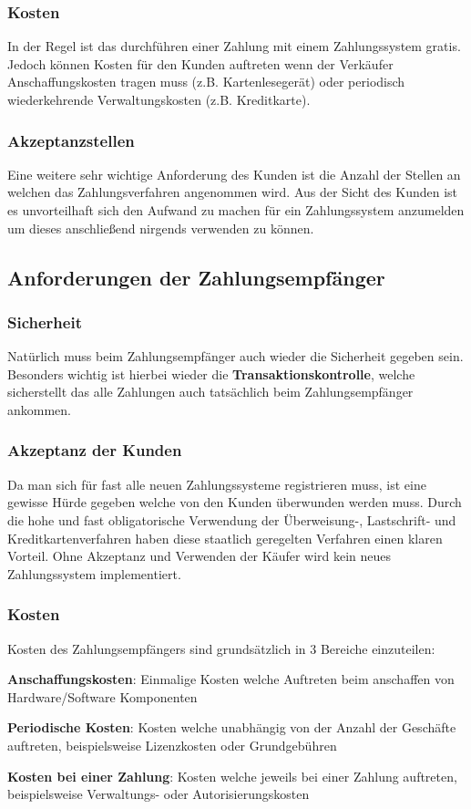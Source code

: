 \subsubsection{Kosten}
In der Regel ist das durchführen einer Zahlung mit einem Zahlungssystem gratis. Jedoch können Kosten für den Kunden auftreten wenn der Verkäufer Anschaffungskosten tragen muss (z.B. Kartenlesegerät) oder periodisch wiederkehrende Verwaltungskosten (z.B. Kreditkarte).

\subsubsection{Akzeptanzstellen}
Eine weitere sehr wichtige Anforderung des Kunden ist die Anzahl der Stellen an welchen das Zahlungsverfahren angenommen wird. Aus der Sicht des Kunden ist es unvorteilhaft sich den Aufwand zu machen für ein Zahlungssystem anzumelden um dieses anschließend nirgends verwenden zu können.

\subsection{Anforderungen der Zahlungsempfänger}
\subsubsection{Sicherheit}
Natürlich muss beim Zahlungsempfänger auch wieder die Sicherheit gegeben sein. Besonders wichtig ist hierbei wieder die \textbf{Transaktionskontrolle}, welche sicherstellt das alle Zahlungen auch tatsächlich beim Zahlungsempfänger ankommen. 

\subsubsection{Akzeptanz der Kunden}
Da man sich für fast alle neuen Zahlungssysteme registrieren muss, ist eine gewisse Hürde gegeben welche von den Kunden überwunden werden muss. Durch die hohe und fast obligatorische Verwendung der Überweisung-, Lastschrift- und Kreditkartenverfahren haben diese staatlich geregelten Verfahren einen klaren Vorteil. Ohne Akzeptanz und Verwenden der Käufer wird kein neues Zahlungssystem implementiert.

\subsubsection{Kosten}
Kosten des Zahlungsempfängers sind grundsätzlich in 3 Bereiche einzuteilen:

\textbf{Anschaffungskosten}: Einmalige Kosten welche Auftreten beim anschaffen von Hardware/Software Komponenten

\textbf{Periodische Kosten}: Kosten welche unabhängig von der Anzahl der Geschäfte auftreten, beispielsweise Lizenzkosten oder Grundgebühren

\textbf{Kosten bei einer Zahlung}: Kosten welche jeweils bei einer Zahlung auftreten, beispielsweise Verwaltungs- oder Autorisierungskosten




